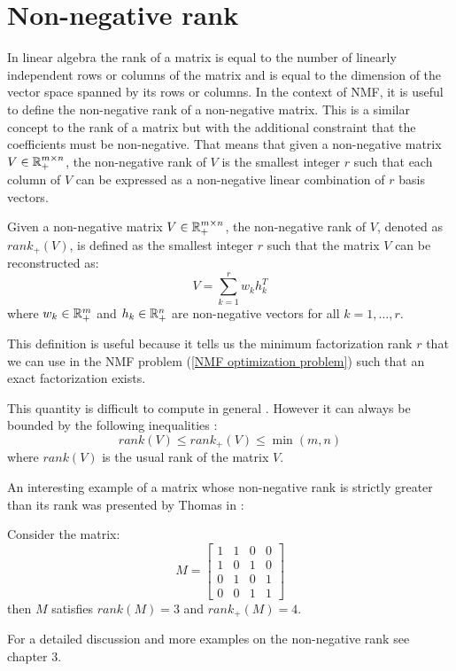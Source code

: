 \section{Non-negative rank}\label{Non-negative rank section}
In linear algebra the rank of a matrix is equal to the number of linearly independent rows or columns of the matrix and is equal to the dimension of the vector space spanned by its rows or columns.
In the context of NMF, it is useful to define the non-negative rank of a non-negative matrix. This is a similar concept to the rank of a matrix but with the additional constraint that the coefficients must be non-negative.
That means that given a non-negative matrix $V \in \mathbb{R}_+^{m \times n}$, the non-negative rank of $V$ is the smallest integer $r$ such that each column of $V$ can be expressed as a non-negative linear combination of $r$ basis vectors.
\begin{definition}
\label{Non-negative rank definition}
Given a non-negative matrix $V \in \mathbb{R}_+^{m \times n}$, the non-negative rank of $V$, denoted as $rank_+(V)$, is defined as the smallest integer $r$ such that the matrix $V$ can be reconstructed as:
\begin{equation}
    V = \sum_{k=1}^{r} w_k h_k^T
\end{equation}
where $w_k \in \mathbb{R}_+^{m}$ and $h_k \in \mathbb{R}_+^{n}$ are non-negative vectors for all $k = 1, \ldots, r$.
\end{definition}
This definition is useful because it tells us the minimum factorization rank $r$ that we can use in the NMF problem (\ref{NMF optimization problem}) such that an exact factorization exists.
\par
This quantity is difficult to compute in general \cite{cohen1993nonnegative}. However it can always be bounded by the following inequalities \cite{gregory1983n}:
\begin{equation} 
    rank(V) \leq rank_+(V) \leq \min(m,n)
\end{equation}
where $rank(V)$ is the usual rank of the matrix $V$.
\par
An interesting example of a matrix whose non-negative rank is strictly greater than its rank was presented by Thomas in \cite{thomas1974rank}:
\begin{example}
Consider the matrix:
\begin{equation}
    M = \begin{bmatrix}
    1 & 1 & 0 & 0 \\
    1 & 0 & 1 & 0 \\
    0 & 1 & 0 & 1 \\
    0 & 0 & 1 & 1
    \end{bmatrix}
\end{equation}
then $M$ satisfies $rank(M) = 3$ and $rank_+(M) = 4$.
\end{example}
For a detailed discussion and more examples on the non-negative rank see \cite{gillis2020nonnegative} chapter $3$.





